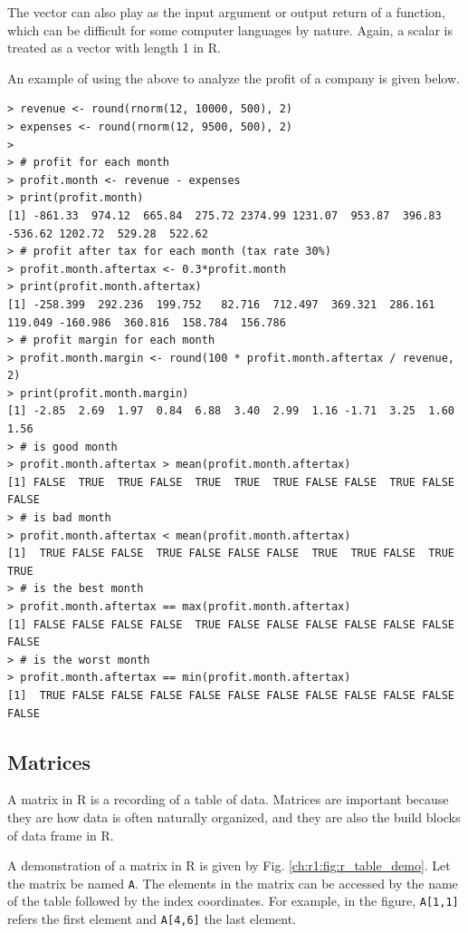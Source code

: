 The vector can also play as the input argument or output return of a function, which can be difficult for some computer languages by nature. Again, a scalar is treated as a vector with length 1 in R.

An example of using the above to analyze the profit of a company is given below.
\begin{lstlisting}
> revenue <- round(rnorm(12, 10000, 500), 2)
> expenses <- round(rnorm(12, 9500, 500), 2)
>
> # profit for each month
> profit.month <- revenue - expenses
> print(profit.month)
[1] -861.33  974.12  665.84  275.72 2374.99 1231.07  953.87  396.83 -536.62 1202.72  529.28  522.62
> # profit after tax for each month (tax rate 30%)
> profit.month.aftertax <- 0.3*profit.month
> print(profit.month.aftertax)
[1] -258.399  292.236  199.752   82.716  712.497  369.321  286.161  119.049 -160.986  360.816  158.784  156.786
> # profit margin for each month
> profit.month.margin <- round(100 * profit.month.aftertax / revenue, 2)
> print(profit.month.margin)
[1] -2.85  2.69  1.97  0.84  6.88  3.40  2.99  1.16 -1.71  3.25  1.60  1.56
> # is good month
> profit.month.aftertax > mean(profit.month.aftertax)
[1] FALSE  TRUE  TRUE FALSE  TRUE  TRUE  TRUE FALSE FALSE  TRUE FALSE FALSE
> # is bad month
> profit.month.aftertax < mean(profit.month.aftertax)
[1]  TRUE FALSE FALSE  TRUE FALSE FALSE FALSE  TRUE  TRUE FALSE  TRUE  TRUE
> # is the best month
> profit.month.aftertax == max(profit.month.aftertax)
[1] FALSE FALSE FALSE FALSE  TRUE FALSE FALSE FALSE FALSE FALSE FALSE FALSE
> # is the worst month
> profit.month.aftertax == min(profit.month.aftertax)
[1]  TRUE FALSE FALSE FALSE FALSE FALSE FALSE FALSE FALSE FALSE FALSE FALSE
\end{lstlisting}

\subsection{Matrices}

A matrix in R is a recording of a table of data. Matrices are important because they are how data is often naturally organized, and they are also the build blocks of data frame in R.

A demonstration of a matrix in R is given by Fig. \ref{ch:r1:fig:r_table_demo}. Let the matrix be named \verb|A|. The elements in the matrix can be accessed by the name of the table followed by the index coordinates. For example, in the figure, \verb|A[1,1]| refers the first element and \verb|A[4,6]| the last element.

